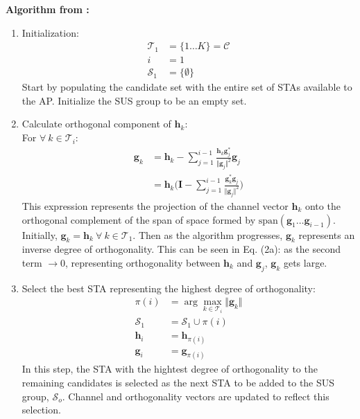 \textbf{Algorithm from \cite{1603708}:}
\begin{enumerate}
    \item Initialization:
    \begin{subequations}
        \begin{align}
            \mathcal{T}_1 &= \lbrace 1 \ldots K \rbrace = \mathcal{C}\\
            i &= 1\\
            \mathcal{S}_1 &= \lbrace \emptyset \rbrace
        \end{align}
    \end{subequations}
    Start by populating the candidate set with the entire set of STAs available to the AP. Initialize the SUS group to be an empty set.
    \item Calculate orthogonal component of $\textbf{h}_k$:\\
    For $\forall \ k \in \mathcal{T}_i$:
    \begin{subequations}
        \begin{align}
            \textbf{g}_k &= \textbf{h}_k - \sum_{j=1}^{i-1}\frac{\textbf{h}_k\textbf{g}_j^*}{\Vert \textbf{g}_j \Vert^2}\textbf{g}_j \\
            &= \textbf{h}_k\bigg(\textbf{I}-\sum_{j=1}^{i-1}\frac{\textbf{g}_k^*\textbf{g}_j}{\Vert \textbf{g}_j \Vert^2}\bigg)
        \end{align}
    \end{subequations}
    This expression represents the projection of the channel vector $\textbf{h}_k$ onto the orthogonal complement of the span of space formed by $\text{span}(\textbf{g}_1\ldots \textbf{g}_{i-1})$. Initially, $\textbf{g}_k = \textbf{h}_k \ \forall \ k \in \mathcal{T}_1$. Then as the algorithm progresses, $\textbf{g}_k$ represents an inverse degree of orthogonality. This can be seen in Eq. (2a): as the second term $\longrightarrow 0$, representing orthogonality between $\textbf{h}_k$ and $\textbf{g}_j$, $\textbf{g}_k$ gets large.
    
    \item Select the best STA representing the highest degree of orthogonality:
    \begin{subequations}
        \begin{align}
            \pi(i) &= \arg\max_{k\in \mathcal{T}_i}\Vert \textbf{g}_k \Vert\\
            \mathcal{S}_1 &= \mathcal{S}_1 \cup \pi(i)\\
            \textbf{h}_i &= \textbf{h}_{\pi(i)}\\
            \textbf{g}_i &= \textbf{g}_{\pi(i)}
        \end{align}
    \end{subequations}
    In this step, the STA with the hightest degree of orthogonality to the remaining candidates is selected as the next STA to be added to the SUS group, $\mathcal{S}_o$. Channel and orthogonality vectors are updated to reflect this selection.
    

\end{enumerate}
